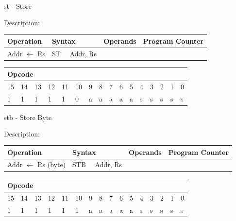 \documentclass[%
	pdftex,
	a4paper,
	oneside,
	bibtotoc,%
	idxtotoc,%
	bibtotocnumbered,
	halfparskip,%
]{scrbook}
\begin{document}
\bigskip

st - Store

Description:

\begin{tabular}{|l|l|l|l|}
\hline
Operation & Syntax & Operands & Program Counter \\ \hline
Addr $\leftarrow $ Rs & ST \ \ Addr, Rs &  &  \\ \hline
\end{tabular}

\begin{tabular}{|c|c|c|c|c|c|c|c|c|c|c|c|c|c|c|c|}
\hline
\multicolumn{6}{|l|}{Opcode} & \multicolumn{5}{|l|}{} & \multicolumn{5}{|l|}{
} \\ \hline
15 & 14 & 13 & 12 & 11 & 10 & 9 & 8 & 7 & 6 & 5 & 4 & 3 & 2 & 1 & 0 \\ \hline
\multicolumn{1}{|l|}{1} & \multicolumn{1}{|l|}{1} & \multicolumn{1}{|l|}{1}
& \multicolumn{1}{|l|}{1} & \multicolumn{1}{|l|}{1} & \multicolumn{1}{|l|}{0}
& \multicolumn{1}{|l|}{a} & \multicolumn{1}{|l|}{a} & \multicolumn{1}{|l|}{a}
& \multicolumn{1}{|l|}{a} & \multicolumn{1}{|l|}{a} & \multicolumn{1}{|l|}{s}
& \multicolumn{1}{|l|}{s} & \multicolumn{1}{|l|}{s} & \multicolumn{1}{|l|}{s}
& \multicolumn{1}{|l|}{s} \\ \hline
\end{tabular}

\bigskip

stb - Store Byte

Description:

\begin{tabular}{|l|l|l|l|}
\hline
Operation & Syntax & Operands & Program Counter \\ \hline
Addr $\leftarrow $ Rs (byte) & STB \ \ Addr, Rs &  &  \\ \hline
\end{tabular}

\begin{tabular}{|c|c|c|c|c|c|c|c|c|c|c|c|c|c|c|c|}
\hline
\multicolumn{6}{|l|}{Opcode} & \multicolumn{5}{|l|}{} & \multicolumn{5}{|l|}{
} \\ \hline
15 & 14 & 13 & 12 & 11 & 10 & 9 & 8 & 7 & 6 & 5 & 4 & 3 & 2 & 1 & 0 \\ \hline
\multicolumn{1}{|l|}{1} & \multicolumn{1}{|l|}{1} & \multicolumn{1}{|l|}{1}
& \multicolumn{1}{|l|}{1} & \multicolumn{1}{|l|}{1} & \multicolumn{1}{|l|}{1}
& \multicolumn{1}{|l|}{a} & \multicolumn{1}{|l|}{a} & \multicolumn{1}{|l|}{a}
& \multicolumn{1}{|l|}{a} & \multicolumn{1}{|l|}{a} & \multicolumn{1}{|l|}{s}
& \multicolumn{1}{|l|}{s} & \multicolumn{1}{|l|}{s} & \multicolumn{1}{|l|}{s}
& \multicolumn{1}{|l|}{s} \\ \hline
\end{tabular}

\bigskip
\end{document}
